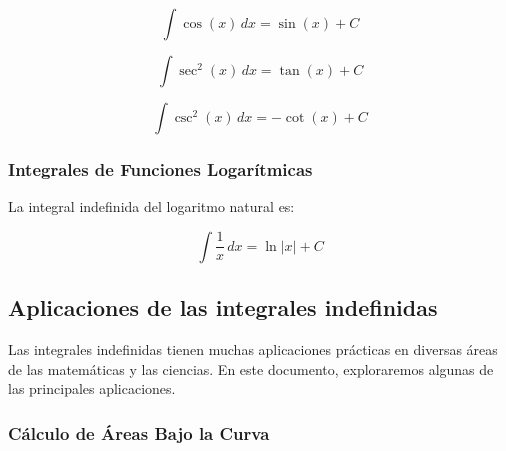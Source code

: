 \[
\int \cos(x) \, dx = \sin(x) + C
\]

\[
\int \sec^2(x) \, dx = \tan(x) + C
\]

\[
\int \csc^2(x) \, dx = -\cot(x) + C
\]

\subsubsection{Integrales de Funciones Logarítmicas}

La integral indefinida del logaritmo natural es:

\[
\int \frac{1}{x} \, dx = \ln |x| + C
\]





\newpage
\subsection{Aplicaciones de las integrales indefinidas}

Las integrales indefinidas tienen muchas aplicaciones prácticas en diversas áreas de las matemáticas y las ciencias. En este documento, exploraremos algunas de las principales aplicaciones.

\subsubsection{Cálculo de Áreas Bajo la Curva}

